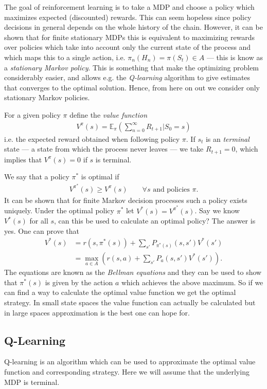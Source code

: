 The goal of reinforcement learning is to take a MDP and choose a policy which maximizes expected (discounted) rewards. This can seem hopeless since policy decisions in general depends on the whole history of the chain. However, it can be shown that for finite stationary MDPs this is equivalent to maximizing rewards over policies which take into account only the current state of the process and which maps this to a single action, i.e. $\pi_n(H_n) = \pi (S_t)\in A$ --- this is know as a \textit{stationary Markov policy}. This is something that make the optimizing problem considerably easier, and allows e.g. the \textit{Q-learning} algorithm to give estimates that converges to the optimal solution. Hence, from here on out we consider only stationary Markov policies.


For a given policy $\pi$ define the \textit{value function}
\begin{align} \label{eq:Vfun}
	V^{\pi}(s) = \mathbb{E}_{\pi}( \sum_{n=0}^{\infty} R_{t+1} | S_0 = s)
\end{align}
i.e. the expected reward obtained when following policy $\pi$. If $s_t$ is an \textit{terminal} state --- a state from which the process never leaves --- we take $R_{t+1} = 0$, which implies that $V^{\pi}(s) = 0$ if $s$ is terminal.

We say that a policy $\pi^*$ is optimal if 
\begin{align*}
	V^{\pi^*}(s) \geq V^{\pi}(s)\qquad \forall s \text{ and policies }\pi.
\end{align*}
It can be shown that for finite Markov decision processes such a policy exists uniquely. Under the optimal policy $\pi^*$ let $V^*(s) = V^{\pi^*}(s)$.
Say we know $V^*(s)$ for all $s$, can this be used to calculate an optimal policy? The answer is yes. One can prove that
\begin{align}
	V^*(s) 
	&=  r(s, \pi^*(s)) + \sum_{s'} P_{\pi^*(s)}(s,s')V^*(s') \\
	&= \max_{a \in A} ( r(s, a) + \sum_{s'} P_{a}(s,s')V^*(s') ).
\end{align}
The equations are known as the \textit{Bellman equations} and they can be used to show that $\pi^*(s)$ is given by the action $a$ which achieves the above maximum. So if we can find a way to calculate the optimal value function we get the optimal strategy. In small state spaces the value function can actually be calculated but in large spaces approximation is the best one can hope for.

\subsection{Q-Learning} \label{sec:Qtheory}
Q-learning is an algorithm which can be used to approximate the optimal value function and corresponding strategy. Here we will assume that the underlying MDP is terminal.

